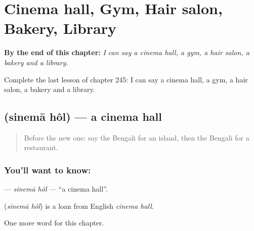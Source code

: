 
\chapter{Cinema hall, Gym, Hair salon, Bakery, Library}
\label{ch:bn-cinema-hall-gym-hair-salon-bakery-library}

\begin{chapteropening}
\textbf{By the end of this chapter:} \emph{I can say a cinema hall, a gym, a hair salon, a bakery and a library.}

Complete the last lesson of chapter 245: I can say a cinema hall, a gym, a hair salon, a bakery and a library.
\end{chapteropening}

\section[\texorpdfstring{\bn{সিনেমা} \bn{হল} (sinemā hôl)}{সিনেমা হল (sinemā hôl)}]{  (sinemā hôl) — a cinema hall}

\label{lesson:BN-C245-sinema-hol}



\begin{quote}
Before the new one: say the Bengali for an island, then the Bengali for a restaurant.
\end{quote}

\subsection*{You'll want to know:  }
\textbf{ } — \emph{sinemā hôl} — \textquotedblleft{}a cinema hall\textquotedblright{}.

\begin{cousinweb}
\textbf{ } (\emph{sinemā hôl}) is a loan from English \emph{cinema hall}.
\end{cousinweb}

\begin{grammarlens}[title={What you've built}]
One more word for this chapter.
\end{grammarlens}

